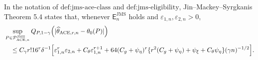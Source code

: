 In the notation of \(\text{def:jms-ace-class}\) and
\(\text{def:jms-eligibility}\), Jin--Mackey--Syrgkanis Theorem 5.4
states that, whenever \(\mathsf E_n^{\mathrm{JMS}}\) holds and
\(\varepsilon_{1,n},\varepsilon_{2,n}>0\),
\[
\begin{split}
 &\sup_{P\in\mathcal P_{\mathrm{ACE},n}^{\mathrm{JMS}}}
 Q_{P,1-\gamma}
 \!\left(|\widehat\theta_{\mathrm{ACE},r,n}-\theta_0(P)|\right)\\
 &\quad\le C_\gamma r!16^r\delta^{-1}
 \Bigl[\varepsilon_{1,n}^r\varepsilon_{2,n}
 +C_\theta\varepsilon_{1,n}^{r+1}
 +64(C_g+\psi_\eta)^r
 \{r^2(C_g+\psi_\eta)+\psi_\xi+C_\theta\psi_\eta\}
 (\gamma n)^{-1/2}\Bigr].
\end{split}
\]